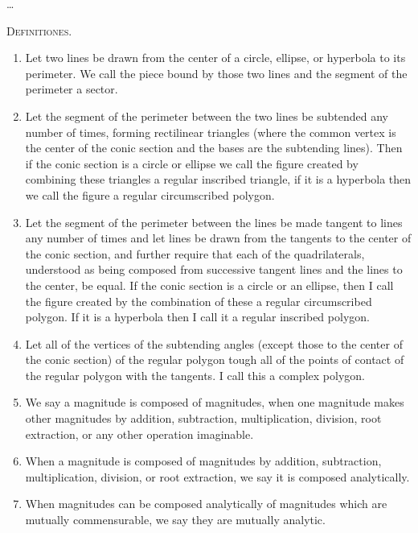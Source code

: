 \documentclass[11pt,letterpaper]{book}
\begin{document}
\ldots

\mainmatter
\begin{center}
\Huge\textsc{Definitiones.}
\end{center}
\begin{enumerate}
  \item Let two lines be drawn from the center of a circle, ellipse, or
  hyperbola to its perimeter. We call the piece bound by those two lines and
  the segment of the perimeter a sector.
  
  \item Let the segment of the perimeter between the two lines be subtended
  any number of times, forming rectilinear triangles (where the common vertex
  is the center of the conic section and the bases are the subtending lines).
  Then if the conic section is a circle or ellipse we call the figure created
  by combining these triangles a regular inscribed triangle, if it is a
  hyperbola then we call the figure a regular circumscribed polygon.
  
  \item Let the segment of the perimeter between the lines be made tangent to
  lines any number of times and let lines be drawn from the tangents to the
  center of the conic section, and further require that each of the
  quadrilaterals, understood as being composed from successive tangent lines
  and the lines to the center, be equal. If the conic section is a circle or an
  ellipse, then I call the figure created by the combination of these a regular
  circumscribed polygon. If it is a hyperbola then I call it a regular
  inscribed polygon.
  
  \item Let all of the vertices of the subtending angles (except those to the
  center of the conic section) of the regular polygon tough all of the points
  of contact of the regular polygon with the tangents. I call this a complex
  polygon.
  
  \item We say a magnitude is composed of magnitudes, when one magnitude
  makes other magnitudes by addition, subtraction, multiplication, division,
  root extraction, or any other operation imaginable.
  
  \item When a magnitude is composed of magnitudes by addition, subtraction,
  multiplication, division, or root extraction, we say it is composed
  analytically.
  
  \item When magnitudes can be composed analytically of magnitudes which are
  mutually commensurable, we say they are mutually analytic.
  

\end{enumerate}
\end{document}

